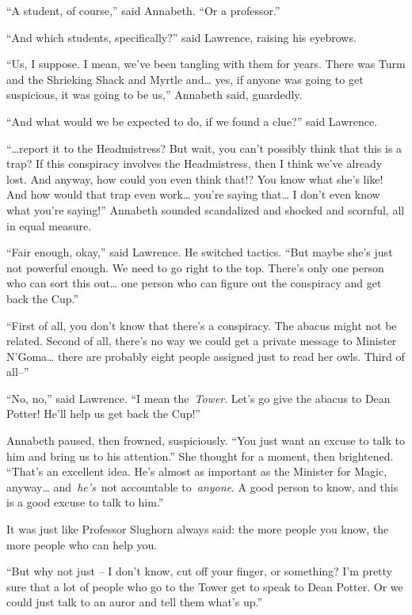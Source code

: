 ``A student, of course,'' said Annabeth. ``Or a professor.''

``And which students, specifically?'' said Lawrence, raising his
eyebrows.

``Us, I suppose. I mean, we've been tangling with them for years. There
was Turm and the Shrieking Shack and Myrtle and\ldots{} yes, if anyone
was going to get suspicious, it was going to be us,'' Annabeth said,
guardedly.

``And what would we be expected to do, if we found a clue?'' said
Lawrence.

``\ldots report it to the Headmistress? But wait, you can't possibly
think that this is a trap? If this conspiracy involves the Headmistress,
then I think we've already lost. And anyway, how could you even think
that!? You know what she's like! And how would that trap even
work\ldots{} you're saying that\ldots{} I don't even know what you're
saying!'' Annabeth sounded scandalized and shocked and scornful, all in
equal measure.

``Fair enough, okay,'' said Lawrence. He switched tactics. ``But maybe
she's just not powerful enough. We need to go right to the top. There's
only one person who can sort this out\ldots{} one person who can figure
out the conspiracy and get back the Cup.''

``First of all, you don't know that there's a conspiracy. The abacus
might not be related. Second of all, there's no way we could get a
private message to Minister N'Goma\ldots{} there are probably eight
people assigned just to read her owls. Third of all--''

``No, no,'' said Lawrence. ``I mean the~\emph{Tower}. Let's go give the
abacus to Dean Potter! He'll help us get back the Cup!''

Annabeth paused, then frowned, suspiciously. ``You just want an excuse
to talk to him and bring us to his attention.'' She thought for a
moment, then brightened. ``That's an excellent idea. He's almost as
important as the Minister for Magic, anyway\ldots{} and~\emph{he's}~not
accountable to~\emph{anyone}. A good person to know, and this is a good
excuse to talk to him.''

It was just like Professor Slughorn always said: the more people you
know, the more people who can help you.

``But why not just -- I don't know, cut off your finger, or something?
I'm pretty sure that a lot of people who go to the Tower get to speak to
Dean Potter. Or we could just talk to an auror and tell them what's
up.''

